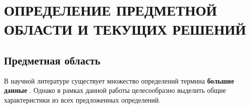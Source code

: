 \section{ОПРЕДЕЛЕНИЕ ПРЕДМЕТНОЙ ОБЛАСТИ И ТЕКУЩИХ РЕШЕНИЙ}


\subsection{Предметная область}









В научной литературе существует множество определений термина \textbf{большие данные} \cite{Bigdata_a_review, Bigdata_an_introduction, Challenges_of_big_data_analysis}. Однако в рамках данной работы целесообразно выделить общие характеристики из всех предложенных определений. 

